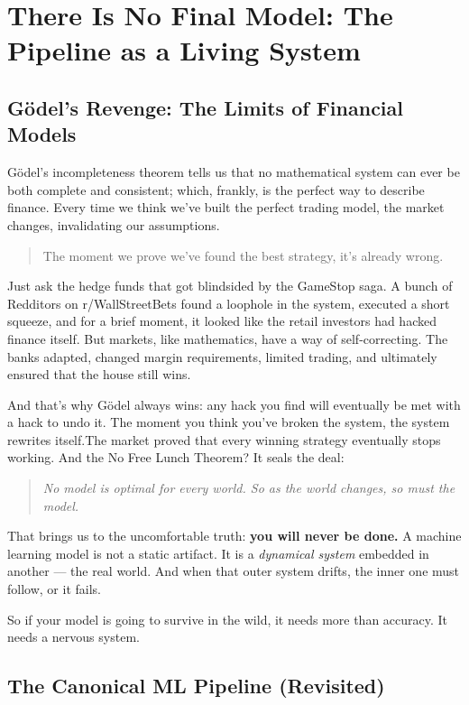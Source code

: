 \section{There Is No Final Model: The Pipeline as a Living System}


\subsection{Gödel’s Revenge: The Limits of Financial Models}

Gödel’s incompleteness theorem tells us that no mathematical system can ever be both complete and consistent; which, frankly, is the perfect way to describe finance. Every time we think we’ve built the perfect trading model, the market changes, invalidating our assumptions.  

\begin{quote}
The moment we prove we’ve found the best strategy, it’s already wrong.
\end{quote}  

Just ask the hedge funds that got blindsided by the GameStop saga. A bunch of Redditors on r/WallStreetBets found a loophole in the system, executed a short squeeze, and for a brief moment, it looked like the retail investors had hacked finance itself. But markets, like mathematics, have a way of self-correcting. The banks adapted, changed margin requirements, limited trading, and ultimately ensured that the house still wins.  

And that’s why Gödel always wins: any hack you find will eventually be met with a hack to undo it. The moment you think you’ve broken the system, the system rewrites itself.The market proved that every winning strategy eventually stops working. And the No Free Lunch Theorem? It seals the deal:

\begin{quote}
\textit{No model is optimal for every world. So as the world changes, so must the model.}
\end{quote}

That brings us to the uncomfortable truth: \textbf{you will never be done.} A machine learning model is not a static artifact. It is a \textit{dynamical system} embedded in another — the real world. And when that outer system drifts, the inner one must follow, or it fails.

So if your model is going to survive in the wild, it needs more than accuracy. It needs a nervous system.

\subsection{The Canonical ML Pipeline (Revisited)}

